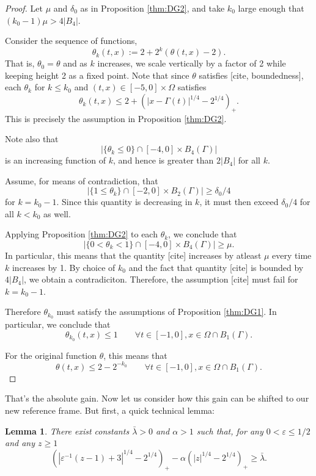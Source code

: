 \documentclass[11pt]{amsart}
\newtheorem{lemma}[theorem]{Lemma}
\theoremstyle{remark}
\theoremstyle{definition}
\newcommand{\eps}{\varepsilon}
\newcommand{\paren}[1]{\left( #1 \right)}
\newcommand{\abs}[1]{\left\lvert #1 \right\rvert}
\newcommand{\n}{^{-1}}
\begin{document}
\begin{proof}
Let $\mu$ and $\delta_0$ as in Proposition \ref{thm:DG2}, and take $k_0$ large enough that $(k_0-1) \mu > 4 |B_4|$.  

Consider the sequence of functions,
\[ \theta_k(t,x) := 2 + 2^k (\theta(t,x) - 2). \]
That is, $\theta_0 = \theta$ and as $k$ increases, we scale vertically by a factor of 2 while keeping height 2 as a fixed point.  Note that since $\theta$ satisfies [cite, boundedness], each $\theta_k$ for $k \leq k_0$ and $(t,x) \in [-5,0] \times \Omega$ satisfies
\[ \theta_k(t,x) \leq 2 + \paren{|x-\Gamma(t)|^{1/4}-2^{1/4}}_+. \]
This is precisely the assumption in Proposition \ref{thm:DG2}.  

Note also that
\[ \abs{\{\theta_k \leq 0\} \cap [-4,0]\times B_4(\Gamma)} \]
is an increasing function of $k$, and hence is greater than $2|B_4|$ for all $k$.  

Assume, for means of contradiction, that
\[ \abs{\{1 \leq \theta_k \} \cap [-2,0]\times B_2(\Gamma)} \geq \delta_0/4 \]
for $k = k_0-1$.  Since this quantity is decreasing in $k$, it must then exceed $\delta_0/4$ for all $ k < k_0$ as well.  

Applying Proposition \ref{thm:DG2} to each $\theta_k$, we conclude that 
\[ \abs{\{0 < \theta_k < 1\} \cap [-4,0]\times B_4(\Gamma)} \geq \mu. \]
In particular, this means that the quantity [cite] increases by atleast $\mu$ every time $k$ increases by 1. By choice of $k_0$ and the fact that quantity [cite] is bounded by $4|B_4|$, we obtain a contradiciton.  Therefore, the assumption [cite] must fail for $k = k_0-1$.  

Therefore $\theta_{k_0}$ must satisfy the assumptions of Proposition \ref{thm:DG1}.  In particular, we conclude that
\[ \theta_{k_0}(t,x) \leq 1 \qquad \forall t \in [-1,0], x \in \Omega \cap B_1(\Gamma). \]

For the original function $\theta$, this means that
\[ \theta(t,x) \leq 2 - 2^{-k_0} \qquad \forall t \in [-1,0], x \in \Omega \cap B_1(\Gamma). \]
\end{proof}

That's the absolute gain.  Now let us consider how this gain can be shifted to our new reference frame.  But first, a quick technical lemma:

\begin{lemma} \label{thm:technical scaling of barrier}
There exist constants $\bar{\lambda} > 0$ and $\alpha > 1$ such that, for any $0 < \eps \leq 1/2$ and any $z \geq 1$
\[ \paren{|\eps\n (z - 1) + 3|^{1/4} - 2^{1/4}}_+ - \alpha \paren{|z|^{1/4} - 2^{1/4}}_+ \geq \bar{\lambda}. \]
\end{lemma}
\end{document}
